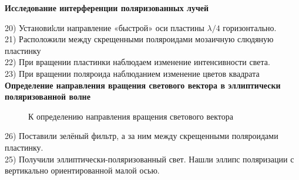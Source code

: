 \documentclass[a4paper,12pt]{article} %
\begin{document}
	
\textbf{Исследование интерференции поляризованных лучей}

 20) Установиkли направление «быстрой» оси пластины $\lambda/4$ горизонтально.\\
 21) Расположили между скрещенными поляроидами мозаичную слюдяную пластинку\\
 22) При вращении пластинки наблюдаем изменение интенсивности света.\\
 23) При вращении поляроида наблюданием изменение цветов квадрата\\

\textbf{Определение направления вращения светового вектора в эллиптически поляризованной волне}

\begin{figure}[H]  
	 \centering {}  
	\hspace{4ex}
	
	\caption{К определению направления вращения светового вектора} 
\end{figure}
 26) Поставили зелёный фильтр, а за ним между скрещенными поляроидами пластинку.\\
 25) Получили эллиптически-поляризованный свет. Нашли эллипс поляризации с вертикально ориентированной малой осью.
\end{document}
